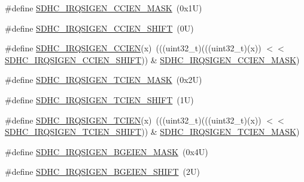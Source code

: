 \begin{DoxyCompactItemize}
\item 
\#define \mbox{\hyperlink{group___s_d_h_c___register___masks_ga393b56f0275bd461a60df5d1dad40370}{S\+D\+H\+C\+\_\+\+I\+R\+Q\+S\+I\+G\+E\+N\+\_\+\+C\+C\+I\+E\+N\+\_\+\+M\+A\+SK}}~(0x1\+U)
\item 
\#define \mbox{\hyperlink{group___s_d_h_c___register___masks_ga7eed6122d048bd5f722d250817adcc96}{S\+D\+H\+C\+\_\+\+I\+R\+Q\+S\+I\+G\+E\+N\+\_\+\+C\+C\+I\+E\+N\+\_\+\+S\+H\+I\+FT}}~(0\+U)
\item 
\#define \mbox{\hyperlink{group___s_d_h_c___register___masks_ga21bdf0243c3cb287123ea87af1802f04}{S\+D\+H\+C\+\_\+\+I\+R\+Q\+S\+I\+G\+E\+N\+\_\+\+C\+C\+I\+EN}}(x)~(((uint32\+\_\+t)(((uint32\+\_\+t)(x)) $<$$<$ \mbox{\hyperlink{group___s_d_h_c___register___masks_ga7eed6122d048bd5f722d250817adcc96}{S\+D\+H\+C\+\_\+\+I\+R\+Q\+S\+I\+G\+E\+N\+\_\+\+C\+C\+I\+E\+N\+\_\+\+S\+H\+I\+FT}})) \& \mbox{\hyperlink{group___s_d_h_c___register___masks_ga393b56f0275bd461a60df5d1dad40370}{S\+D\+H\+C\+\_\+\+I\+R\+Q\+S\+I\+G\+E\+N\+\_\+\+C\+C\+I\+E\+N\+\_\+\+M\+A\+SK}})
\item 
\#define \mbox{\hyperlink{group___s_d_h_c___register___masks_ga18f4e41f80857c3a86c3ee99dad7fef0}{S\+D\+H\+C\+\_\+\+I\+R\+Q\+S\+I\+G\+E\+N\+\_\+\+T\+C\+I\+E\+N\+\_\+\+M\+A\+SK}}~(0x2\+U)
\item 
\#define \mbox{\hyperlink{group___s_d_h_c___register___masks_ga6725fe5d247936a430d035b3860ae9f9}{S\+D\+H\+C\+\_\+\+I\+R\+Q\+S\+I\+G\+E\+N\+\_\+\+T\+C\+I\+E\+N\+\_\+\+S\+H\+I\+FT}}~(1\+U)
\item 
\#define \mbox{\hyperlink{group___s_d_h_c___register___masks_ga51ae5be980c62b1a71b901ed7154d40c}{S\+D\+H\+C\+\_\+\+I\+R\+Q\+S\+I\+G\+E\+N\+\_\+\+T\+C\+I\+EN}}(x)~(((uint32\+\_\+t)(((uint32\+\_\+t)(x)) $<$$<$ \mbox{\hyperlink{group___s_d_h_c___register___masks_ga6725fe5d247936a430d035b3860ae9f9}{S\+D\+H\+C\+\_\+\+I\+R\+Q\+S\+I\+G\+E\+N\+\_\+\+T\+C\+I\+E\+N\+\_\+\+S\+H\+I\+FT}})) \& \mbox{\hyperlink{group___s_d_h_c___register___masks_ga18f4e41f80857c3a86c3ee99dad7fef0}{S\+D\+H\+C\+\_\+\+I\+R\+Q\+S\+I\+G\+E\+N\+\_\+\+T\+C\+I\+E\+N\+\_\+\+M\+A\+SK}})
\item 
\#define \mbox{\hyperlink{group___s_d_h_c___register___masks_ga56ccc2a22e90f8d92cf3a7ad63791861}{S\+D\+H\+C\+\_\+\+I\+R\+Q\+S\+I\+G\+E\+N\+\_\+\+B\+G\+E\+I\+E\+N\+\_\+\+M\+A\+SK}}~(0x4\+U)
\item 
\#define \mbox{\hyperlink{group___s_d_h_c___register___masks_ga4a14bf5315dcb669dc529920384cdf97}{S\+D\+H\+C\+\_\+\+I\+R\+Q\+S\+I\+G\+E\+N\+\_\+\+B\+G\+E\+I\+E\+N\+\_\+\+S\+H\+I\+FT}}~(2\+U)

\end{DoxyCompactItemize}

